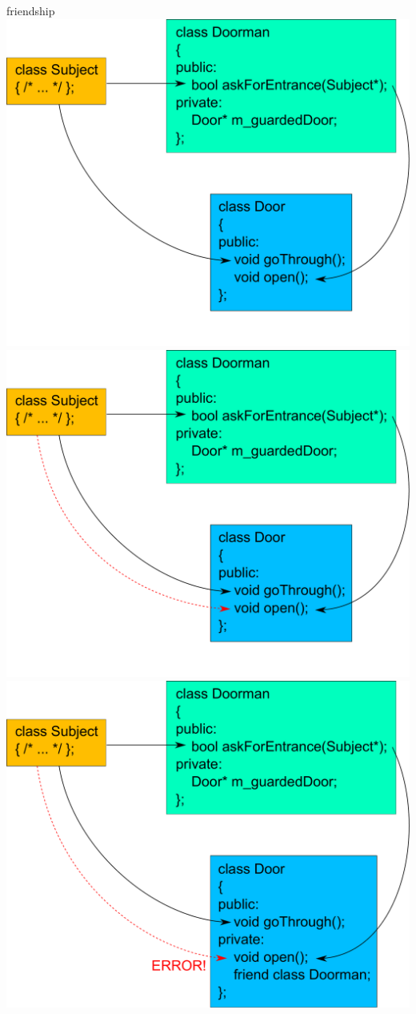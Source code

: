 \begin{frame}{friendship}
	\onslide*<+> { \includegraphics[height=0.75\textheight]{images/without-friendship} }
	\onslide*<+> { \includegraphics[height=0.75\textheight]{images/without-friendship-unauth} }
	\onslide*<+> { \includegraphics[height=0.75\textheight]{images/with-friendship} }
\end{frame}
